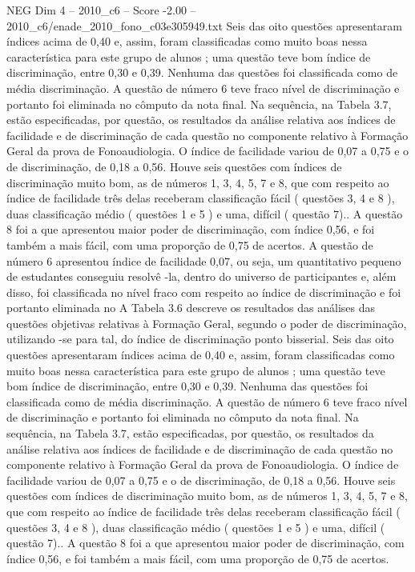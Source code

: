 \begin{textsample}{NEG Dim 4 – 2010\_c6 – Score -2.00 – 2010\_c6/enade\_2010\_fono\_c03e305949.txt}
Seis das oito questões apresentaram índices acima de 0,40 e, assim, foram classificadas como muito boas nessa característica para este grupo de alunos ; uma questão teve bom índice de discriminação, entre 0,30 e 0,39.
Nenhuma das questões foi classificada como de média discriminação.
A questão de número 6 teve fraco nível de discriminação e portanto foi eliminada no cômputo da nota final.
Na sequência, na Tabela 3.7, estão especificadas, por questão, os resultados da análise relativa aos índices de facilidade e de discriminação de cada questão no componente relativo à Formação Geral da prova de Fonoaudiologia.
O índice de facilidade variou de 0,07 a 0,75 e o de discriminação, de 0,18 a 0,56.
Houve seis questões com índices de discriminação muito bom, as de números 1, 3, 4, 5, 7 e 8, que com respeito ao índice de facilidade três delas receberam classificação fácil ( questões 3, 4 e 8 ), duas classificação médio ( questões 1 e 5 ) e uma, difícil ( questão 7)..
A questão 8 foi a que apresentou maior poder de discriminação, com índice 0,56, e foi também a mais fácil, com uma proporção de 0,75 de acertos.
A questão de número 6 apresentou índice de facilidade 0,07, ou seja, um quantitativo pequeno de estudantes conseguiu resolvê -la, dentro do universo de participantes e, além disso, foi classificada no nível fraco com respeito ao índice de discriminação e foi portanto eliminada no A Tabela 3.6 descreve os resultados das análises das questões objetivas relativas à Formação Geral, segundo o poder de discriminação, utilizando -se para tal, do índice de discriminação ponto bisserial.
Seis das oito questões apresentaram índices acima de 0,40 e, assim, foram classificadas como muito boas nessa característica para este grupo de alunos ; uma questão teve bom índice de discriminação, entre 0,30 e 0,39.
Nenhuma das questões foi classificada como de média discriminação.
A questão de número 6 teve fraco nível de discriminação e portanto foi eliminada no cômputo da nota final.
Na sequência, na Tabela 3.7, estão especificadas, por questão, os resultados da análise relativa aos índices de facilidade e de discriminação de cada questão no componente relativo à Formação Geral da prova de Fonoaudiologia.
O índice de facilidade variou de 0,07 a 0,75 e o de discriminação, de 0,18 a 0,56.
Houve seis questões com índices de discriminação muito bom, as de números 1, 3, 4, 5, 7 e 8, que com respeito ao índice de facilidade três delas receberam classificação fácil ( questões 3, 4 e 8 ), duas classificação médio ( questões 1 e 5 ) e uma, difícil ( questão 7)..
A questão 8 foi a que apresentou maior poder de discriminação, com índice 0,56, e foi também a mais fácil, com uma proporção de 0,75 de acertos.

\end{textsample}
